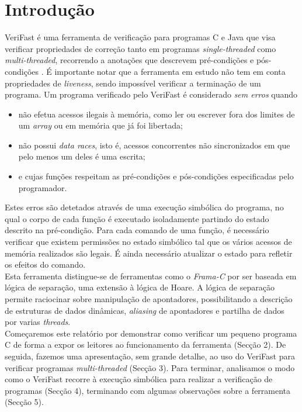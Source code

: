 \section{Introdução}

VeriFast é uma ferramenta de verificação para programas C e Java que visa verificar propriedades de correção tanto em programas \textit{single-threaded} como \textit{multi-threaded}, recorrendo a anotações que descrevem pré-condições e pós-condições . É importante notar que a ferramenta em estudo não tem em conta propriedades de \textit{liveness}, sendo impossível verificar a terminação de um programa. Um programa verificado pelo VeriFast é considerado \textit{sem erros} quando

\begin{itemize}
    \item não efetua acessos ilegais à memória, como ler ou escrever fora dos limites de um \textit{array} ou em memória que já foi libertada;
    \item não possui \textit{data races}, isto é, acessos concorrentes não sincronizados em que pelo menos um deles é uma escrita;
    \item e cujas funções respeitam as pré-condições e pós-condições especificadas pelo programador.
\end{itemize}

Estes erros são detetados através de uma execução simbólica do programa, no qual o corpo de cada função é executado isoladamente partindo do estado descrito na pré-condição. Para cada comando de uma função, é necessário verificar que existem permissões no estado simbólico tal que os vários acessos de memória realizados são legais. É ainda necessário atualizar o estado para refletir os efeitos do comando. \\

Esta ferramenta distingue-se de ferramentas como o \textit{Frama-C} por ser baseada em lógica de separação, uma extensão à lógica de Hoare. A lógica de separação permite raciocinar sobre manipulação de apontadores, possibilitando a descrição de estruturas de dados dinâmicas, \textit{aliasing} de apontadores e partilha de dados por varias \textit{threads}. \\

Começaremos este relatório por demonstrar como verificar um pequeno programa C de forma a expor os leitores ao funcionamento da ferramenta (Secção 2). De seguida, fazemos uma apresentação, sem grande detalhe, ao uso do VeriFast para verificar programas \textit{multi-threaded} (Secção 3). Para terminar, analisamos o modo como o VeriFast recorre à execução simbólica para realizar a verificação de programas (Secção 4), terminando com algumas observações sobre a ferramenta (Secção 5).
